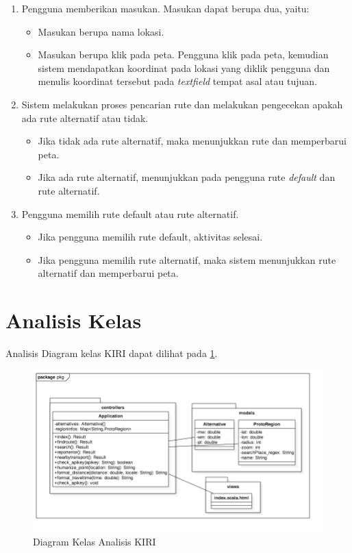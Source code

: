 \begin{enumerate}
	\item Pengguna memberikan masukan. Masukan dapat berupa dua, yaitu:
	\begin{itemize}
		\item Masukan berupa nama lokasi.
		\item Masukan berupa klik pada peta. Pengguna klik pada peta, kemudian sistem mendapatkan koordinat pada lokasi yang diklik pengguna dan menulis koordinat tersebut pada \textit{textfield} tempat asal atau tujuan.
	\end{itemize}
	\item Sistem melakukan proses pencarian rute dan melakukan pengecekan apakah ada rute alternatif atau tidak.
	\begin{itemize}
		\item Jika tidak ada rute alternatif, maka menunjukkan rute dan memperbarui peta.
		\item Jika ada rute alternatif, menunjukkan pada pengguna rute \textit{default} dan rute alternatif.
	\end{itemize}
	\item Pengguna memilih rute default atau rute alternatif.
	\begin{itemize}
		\item Jika pengguna memilih rute default, aktivitas selesai.
		\item Jika pengguna memilih rute alternatif, maka sistem menunjukkan rute alternatif dan memperbarui peta.
	\end{itemize}
\end{enumerate}


\section{Analisis Kelas}
\label{sec:kelasdiagram}
Analisis Diagram kelas KIRI dapat dilihat pada \ref{fig:3_classdiagram}.

\begin{figure}[H]
	\centering
	\includegraphics[scale=0.6]{Gambar/Class-Diagram-Analisis}
	\caption{Diagram Kelas Analisis KIRI} 
	\label{fig:3_classdiagram}
\end{figure}

